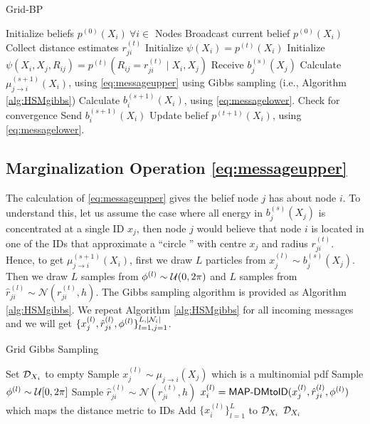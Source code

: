 \documentclass[10pt, final, journal]{IEEEtran}
\begin{document}
\begin{algorithm}
\caption{Grid-BP}
\begin{algorithmic}[1]
\label{alg:HSM}

\STATE Initialize beliefs $p^{(0)}(X_{i}) ~\forall i \in $ Nodes
\STATE Broadcast current belief $p^{(0)}(X_{i})$
\STATE Collect distance estimates  $r^{(t)}_{ji}$
\ENDFOR
\ENDFOR
\STATE Initialize $\psi(X_{i}) =p^{(t)}(X_{i})$
\STATE Initialize $\psi(X_{i}, X_{j}, R_{ij})= p^{(t)}(R_{ij}= r^{(t)}_{ji} \mid X_{i}, X_{j})$
\REPEAT
{}
\STATE Receive $b^{(s)}_{j}(X_{j}) $
\STATE Calculate  $\mu^{(s+1)}_{j \rightarrow i}(X_{i}) $, using \eqref{eq:messageupper} using Gibbs sampling (i.e., Algorithm \ref{alg:HSMgibbs})
\ENDFOR
\STATE Calculate  $b^{(s+1)}_{i}(X_{i})$, using \eqref{eq:messagelower}.
\STATE Check for convergence
\STATE Send $b^{(s+1)}_{i}(X_{i}) $
\ENDFOR
{}
\STATE Update belief $p^{(t+1)}(X_{i})$, using \eqref{eq:messagelower}.
\ENDFOR
\end{algorithmic}
\end{algorithm}
 \vspace{-.1in}

\subsection{Marginalization Operation \eqref{eq:messageupper}}\label{marginilizationoperation}
The calculation of \eqref{eq:messageupper} gives the belief node $j$ has about node $i$. To understand this, let us assume the case where all energy in  $b^{(s)}_{j}(X_{j}) $ is concentrated at a single ID $x_j$, then node $j$ would believe that  node $i$ is located in one of the IDs that approximate  a ``circle '' with centre $x_j$ and radius  $ r^{(t)}_{ji}$. Hence, to get $\mu^{(s+1)}_{j \rightarrow i}(X_{i}) $, first we draw $L$ particles from $x_j^{(l)} \sim b^{(s)}_{j}(X_{j}) $. Then we draw $L$ samples from  $\phi^{(l)} \sim {\cal U}(0, 2\pi)$ and $L$ samples from $\hat{r}^{(l)}_{ji}\sim \mathcal{N}(r^{(t)}_{ji}, h)$. The Gibbs sampling algorithm is provided as Algorithm \ref{alg:HSMgibbs}.  We repeat Algorithm  \ref{alg:HSMgibbs} for all incoming messages and we will get  $\{x_j^{(l)},\hat{r}_{ji}^{(l)},\phi^{(l)}\}_{l=1,j=1}^{L,\mid {\cal N}_i \mid}$.

\begin{algorithm}
\caption{Grid Gibbs Sampling}
\begin{algorithmic}[1]
\label{alg:HSMgibbs}
\STATE Set ${\cal D}_{ X_{i}}$ to empty
\STATE Sample $ x^{(l)}_{j}\sim \mu_{j \rightarrow i}( X_{j})$ which is a multinomial pdf
\STATE Sample $\phi^{(l)} \sim {\cal U}[0, 2\pi]$
\STATE Sample $\hat{r}^{(l)}_{ji}\sim \mathcal{N}(r^{(t)}_{ji}, h)$
\STATE $ x^{(l)}_{i} ={\sf MAP}\text{-}{\sf DMtoID}(x^{(l)}_{j} , \hat{r}^{(l)}_{ji},\phi^{(l)})$ which maps the distance metric to IDs
\STATE Add $ \{  x^{(l)}_{i} \}_{l=1}^{L}$ to ${\cal D}_{ X_{i}}$
\ENDFOR
\RETURN ${\cal D}_{ X_{i}}$
\end{algorithmic}
\end{algorithm}
\end{document}
